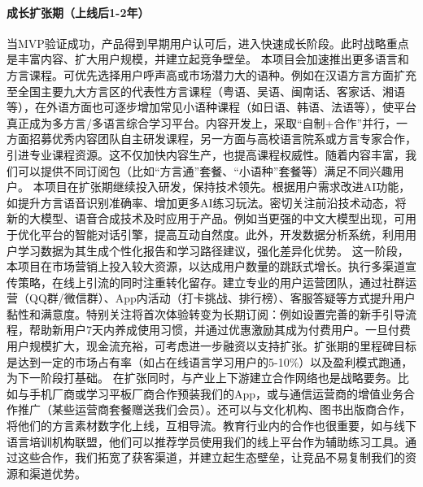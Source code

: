\paragraph{成长扩张期（上线后1-2年）}当MVP验证成功，产品得到早期用户认可后，进入快速成长阶段。此时战略重点是丰富内容、扩大用户规模，并建立起竞争壁垒。
	本项目会加速推出更多语言和方言课程。可优先选择用户呼声高或市场潜力大的语种。例如在汉语方言方面扩充至全国主要九大方言区的代表性方言课程（粤语、吴语、闽南话、客家话、湘语等），在外语方面也可逐步增加常见小语种课程（如日语、韩语、法语等），使平台真正成为多方言/多语言综合学习平台。内容开发上，采取“自制+合作”并行，一方面招募优秀内容团队自主研发课程，另一方面与高校语言院系或方言专家合作，引进专业课程资源。这不仅加快内容生产，也提高课程权威性。随着内容丰富，我们可以提供不同订阅包（比如“方言通”套餐、“小语种”套餐等）满足不同兴趣用户。
	本项目在扩张期继续投入研发，保持技术领先。根据用户需求改进AI功能，如提升方言语音识别准确率、增加更多AI练习玩法。密切关注前沿技术动态，将新的大模型、语音合成技术及时应用于产品。例如当更强的中文大模型出现，可用于优化平台的智能对话引擎，提高互动自然度。此外，开发数据分析系统，利用用户学习数据为其生成个性化报告和学习路径建议，强化差异化优势。
	这一阶段，本项目在市场营销上投入较大资源，以达成用户数量的跳跃式增长。执行多渠道宣传策略，在线上引流的同时注重转化留存。建立专业的用户运营团队，通过社群运营（QQ群/微信群）、App内活动（打卡挑战、排行榜）、客服答疑等方式提升用户黏性和满意度。特别关注将首次体验转变为长期订阅：例如设置完善的新手引导流程，帮助新用户7天内养成使用习惯，并通过优惠激励其成为付费用户。一旦付费用户规模扩大，现金流充裕，可考虑进一步融资以支持扩张。扩张期的里程碑目标是达到一定的市场占有率（如占在线语言学习用户的5-10\%）以及盈利模式跑通，为下一阶段打基础。
	在扩张同时，与产业上下游建立合作网络也是战略要务。比如与手机厂商或学习平板厂商合作预装我们的App，或与通信运营商的增值业务合作推广（某些运营商套餐赠送我们会员）。还可以与文化机构、图书出版商合作，将他们的方言素材数字化上线，互相导流。教育行业内的合作也很重要，如与线下语言培训机构联盟，他们可以推荐学员使用我们的线上平台作为辅助练习工具。通过这些合作，我们拓宽了获客渠道，并建立起生态壁垒，让竞品不易复制我们的资源和渠道优势。

